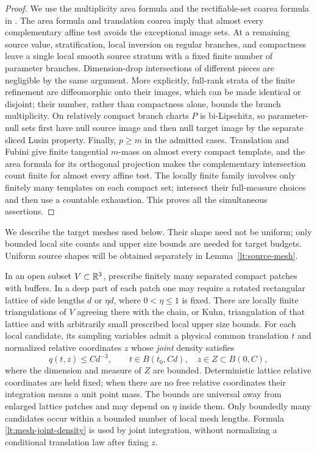 \begin{proof}
We use the multiplicity area formula and the rectifiable-set coarea
formula in \cite[Chapter~2, Section~3, and Chapter~3, Section~2]{Simon2014Draft}.
The area formula and translation coarea imply that almost every
complementary affine test avoids the exceptional image sets.  At a
remaining source value, stratification, local inversion on regular
branches, and compactness leave a single local smooth source stratum
with a fixed finite number of parameter branches.  Dimension-drop
intersections of different pieces are negligible by the same argument.
More explicitly, full-rank strata of the finite refinement are
diffeomorphic onto their images, which can be made identical or
disjoint; their number, rather than compactness alone, bounds the
branch multiplicity. On relatively compact branch charts $P$ is
bi-Lipschitz, so parameter-null sets first have null source image and
then null target image by the separate sliced Lusin property.
Finally, $p\ge m$ in the admitted cases. Translation and Fubini give
finite tangential $m$-mass on almost every compact template, and the
area formula for its orthogonal projection makes the complementary
intersection count finite for almost every affine test.
The locally finite family involves only finitely many templates on
each compact set; intersect their full-measure choices and then use
a countable exhaustion.  This proves all the simultaneous assertions.
\end{proof}

We describe the target meshes used below.  Their shape need not be
uniform; only bounded local site counts and upper size bounds are
needed for target budgets.  Uniform source shapes will be obtained
separately in Lemma~\ref{lt:source-mesh}.

\begin{lemma}
\label{lt:target-mesh}
In an open subset $V\subset\mathbb R^3$, prescribe finitely many separated
compact patches with buffers.  In a deep part of each patch one may
require a rotated rectangular lattice of side lengths $d$ or
$\eta d$, where $0<\eta\leq1$ is fixed.  There are locally finite
triangulations of $V$ agreeing there with the chain, or Kuhn,
triangulation of that lattice and with arbitrarily small prescribed
local upper size bounds.  For each local candidate, its sampling variables admit a physical
common translation $t$ and normalized relative coordinates $z$ whose
\emph{joint} density satisfies
\begin{equation}
 q(t,z)\leq Cd^{-3},\qquad
 t\in B(t_0,Cd),\quad z\in Z\subset B(0,C),
 \label{lt:mesh-joint-density}
\end{equation}
where the dimension and measure of $Z$ are bounded.  Deterministic
lattice relative coordinates are held fixed; when there are no free
relative coordinates their integration means a unit point mass.
The bounds are universal away from enlarged lattice patches and may
depend on $\eta$ inside them.  Only boundedly many candidates occur
within a bounded number of local mesh lengths.  Formula
\eqref{lt:mesh-joint-density} is used by joint integration, without
normalizing a conditional translation law after fixing $z$.
\end{lemma}

